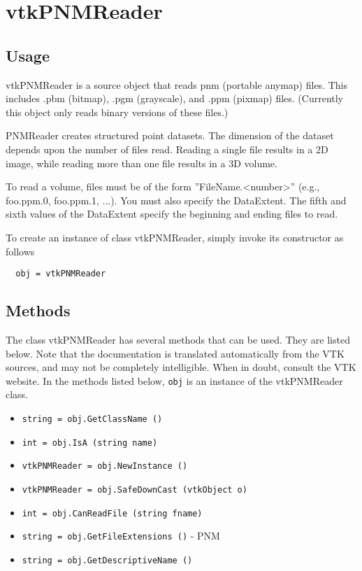 \section{vtkPNMReader}

\subsection{Usage}

 vtkPNMReader is a source object that reads pnm (portable anymap) files.
 This includes .pbm (bitmap), .pgm (grayscale), and .ppm (pixmap) files.
 (Currently this object only reads binary versions of these files.)

 PNMReader creates structured point datasets. The dimension of the 
 dataset depends upon the number of files read. Reading a single file 
 results in a 2D image, while reading more than one file results in a 
 3D volume.

 To read a volume, files must be of the form ''FileName.<number>'' (e.g.,
 foo.ppm.0, foo.ppm.1, ...). You must also specify the DataExtent.  The
 fifth and sixth values of the DataExtent specify the beginning and ending
 files to read.

To create an instance of class vtkPNMReader, simply
invoke its constructor as follows
\begin{verbatim}
  obj = vtkPNMReader
\end{verbatim}
\subsection{Methods}

The class vtkPNMReader has several methods that can be used.
  They are listed below.
Note that the documentation is translated automatically from the VTK sources,
and may not be completely intelligible.  When in doubt, consult the VTK website.
In the methods listed below, \verb|obj| is an instance of the vtkPNMReader class.
\begin{itemize}
\item  \verb|string = obj.GetClassName ()|

\item  \verb|int = obj.IsA (string name)|

\item  \verb|vtkPNMReader = obj.NewInstance ()|

\item  \verb|vtkPNMReader = obj.SafeDownCast (vtkObject o)|

\item  \verb|int = obj.CanReadFile (string fname)|

\item  \verb|string = obj.GetFileExtensions ()| -  PNM 

\item  \verb|string = obj.GetDescriptiveName ()|

\end{itemize}
